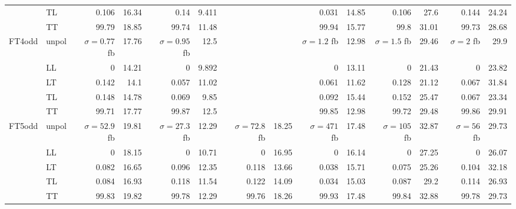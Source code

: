 \begin{table}[H]
{\begin{tabular}{llrrrrrrrrrrrr}
 & TL & \num{0.106} & \num{16.34} & \num{0.14} & \num{9.411} &  &  & \num{0.031} & \num{14.85} & \num{0.106} & \num{27.6} & \num{0.144} & \num{24.24} \\
 & TT & \num{99.79} & \num{18.85} & \num{99.74} & \num{11.48} &  &  & \num{99.94} & \num{15.77} & \num{99.8} & \num{31.01} & \num{99.73} & \num{28.68} \\
\midrule
\multirow{5}{*}{FT4odd}
 & unpol & $\sigma = \num{0.77}$ fb & \num{17.76} & $\sigma = \num{0.95}$ fb & \num{12.5} &  &  & $\sigma = \num{1.2}$ fb & \num{12.98} & $\sigma = \num{1.5}$ fb & \num{29.46} & $\sigma = \num{2}$ fb & \num{29.9} \\
 & LL & \num{0} & \num{14.21} & \num{0} & \num{9.892} &  &  & \num{0} & \num{13.11} & \num{0} & \num{21.43} & \num{0} & \num{23.82} \\
 & LT & \num{0.142} & \num{14.1} & \num{0.057} & \num{11.02} &  &  & \num{0.061} & \num{11.62} & \num{0.128} & \num{21.12} & \num{0.067} & \num{31.84} \\
 & TL & \num{0.148} & \num{14.78} & \num{0.069} & \num{9.85} &  &  & \num{0.092} & \num{15.44} & \num{0.152} & \num{25.47} & \num{0.067} & \num{23.34} \\
 & TT & \num{99.71} & \num{17.77} & \num{99.87} & \num{12.5} &  &  & \num{99.85} & \num{12.98} & \num{99.72} & \num{29.48} & \num{99.86} & \num{29.91} \\
\midrule
\multirow{5}{*}{FT5odd}
 & unpol & $\sigma = \num{52.9}$ fb & \num{19.81} & $\sigma = \num{27.3}$ fb & \num{12.29} & $\sigma = \num{72.8}$ fb & \num{18.25} & $\sigma = \num{471}$ fb & \num{17.48} & $\sigma = \num{105}$ fb & \num{32.87} & $\sigma = \num{56}$ fb & \num{29.73} \\
 & LL & \num{0} & \num{18.15} & \num{0} & \num{10.71} & \num{0} & \num{16.95} & \num{0} & \num{16.14} & \num{0} & \num{27.25} & \num{0} & \num{26.07} \\
 & LT & \num{0.082} & \num{16.65} & \num{0.096} & \num{12.35} & \num{0.118} & \num{13.66} & \num{0.038} & \num{15.71} & \num{0.075} & \num{25.26} & \num{0.104} & \num{32.18} \\
 & TL & \num{0.084} & \num{16.93} & \num{0.118} & \num{11.54} & \num{0.122} & \num{14.09} & \num{0.034} & \num{15.03} & \num{0.087} & \num{29.2} & \num{0.114} & \num{26.93} \\
 & TT & \num{99.83} & \num{19.82} & \num{99.78} & \num{12.29} & \num{99.76} & \num{18.26} & \num{99.93} & \num{17.48} & \num{99.84} & \num{32.88} & \num{99.78} & \num{29.73} \\

\end{tabular}}
\end{table}
